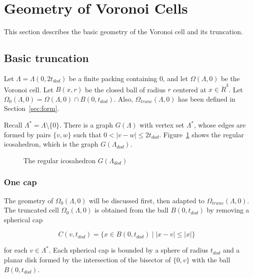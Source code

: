 \documentclass{article} %
\begin{document}
\section{Geometry of Voronoi Cells}

This section describes the basic geometry of the Voronoi cell and its
truncation.

\subsection{Basic truncation}
\label{sec:in-ex}

Let $\Lambda = \Lambda(0,2t_{dod})$ be a finite packing containing
$0$, and let $\Omega(\Lambda,0)$ be the Voronoi cell. Let $B(x,r)$ be
the closed ball of radius $r$ centered at $x\in\ring{R}^3$. Let
$\Omega_0(\Lambda,0) = \Omega(\Lambda,0)\cap B(0,t_{dod})$. Also,
$\Omega_{trunc}(\Lambda,0)$ has been defined in
Section~\ref{sec:form}.

Recall $\Lambda^* = \Lambda\setminus\{0\}$.  There is a graph $G(\Lambda)$
with vertex set $\Lambda^*$, whose edges are formed by pairs
$\{v,w\}$ such that $0<|v-w|\le 2t_{dod}$.  Figure~\ref{fig:icos}
shows the regular icosahedron, which is the graph $G(\Lambda_{dod})$.

\begin{figure}[htb]
  \begin{center}
  \end{center}
  \caption{The regular icosahedron $G(\Lambda_{dod})$}
  \label{fig:icos}
\end{figure}

\subsubsection{One cap}

The geometry of $\Omega_0(\Lambda,0)$ will be discussed first,
then adapted to $\Omega_{trunc}(\Lambda,0)$.  The truncated cell
$\Omega_0(\Lambda,0)$ is obtained from the ball $B(0,t_{dod})$ by
removing a spherical cap

$$
C(v,t_{dod}) = \{x \in B(0,t_{dod}) \mid  |x - v| \le |x| \}
$$

\noindent for each $v\in\Lambda^*$.
Each spherical cap is bounded by a sphere of radius $t_{dod}$ and
a planar disk formed by the intersection of the bisector of 
$\{0,v\}$ with the ball $B(0,t_{dod})$.
\end{document}
